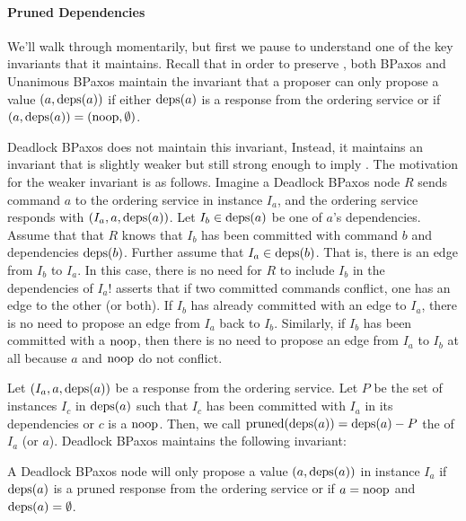 \paragraph{Pruned Dependencies}
We'll walk through  momentarily, but first we pause to
understand one of the key invariants that it maintains. Recall that in order to
preserve , both BPaxos and Unanimous BPaxos maintain
the invariant that a proposer can only propose a value $(a, \text{deps}(a))$ if
either $\text{deps}(a)$ is a response from the ordering service or if $(a, \text{deps}(a))
= (\text{noop}, \emptyset)$.

Deadlock BPaxos does not maintain this invariant, Instead, it maintains an
invariant that is slightly weaker but still strong enough to imply
. The motivation for the weaker invariant is as
follows. Imagine a Deadlock BPaxos node $R$ sends command $a$ to the ordering
service in instance $I_a$, and the ordering service responds with $(I_a, a,
\text{deps}(a))$. Let $I_b \in \text{deps}(a)$ be one of $a$'s dependencies. Assume that
that $R$ knows that $I_b$ has been committed with command $b$ and dependencies
$\text{deps}(b)$. Further assume that $I_a \in \text{deps}(b)$. That is, there is an edge
from $I_b$ to $I_a$. In this case, there is no need for $R$ to include $I_b$ in
the dependencies of $I_a$!  asserts that if two
committed commands conflict, one has an edge to the other (or both). If $I_b$
has already committed with an edge to $I_a$, there is no need to propose an
edge from $I_a$ back to $I_b$.
%
Similarly, if $I_b$ has been committed with a $\text{noop}$, then there is no need to
propose an edge from $I_a$ to $I_b$ at all because $a$ and $\text{noop}$ do not
conflict.

\newcommand{\pruned}{\text{pruned}}
Let $(I_a, a, \text{deps}(a))$ be a response from the ordering service. Let $P$ be
the set of instances $I_c$ in $\text{deps}(a)$ such that $I_c$ has been committed
with $I_a$ in its dependencies or $c$ is a $\text{noop}$. Then, we call
$\pruned(\deps{a}) = \deps{a} - P$ the  of $I_a$
(or $a$). Deadlock BPaxos maintains the following invariant:

\begin{boxedinvariant}
  A Deadlock BPaxos node will only propose a value $(a, \text{deps}(a))$ in instance
  $I_a$ if $\text{deps}(a)$ is a pruned response from the ordering service or if $a =
  \text{noop}$ and $\text{deps}(a) = \emptyset$.
\end{boxedinvariant}

